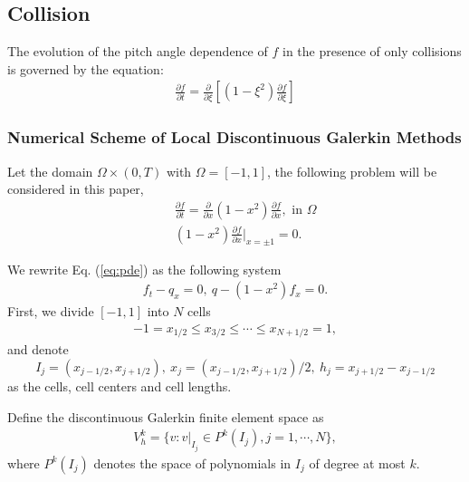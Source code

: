 \documentclass[final,leqno]{siamltex704}
\begin{document}

\subsection{Collision}

The evolution of the pitch angle dependence of $f$ in the presence of only collisions is governed by the equation:
\begin{eqnarray}
\frac{\partial f}{\partial t} = \frac{\partial}{\partial\xi}[(1-\xi^2)\frac{\partial f}{\partial\xi}]
\end{eqnarray}


\subsubsection{Numerical Scheme of Local Discontinuous Galerkin Methods}
Let the domain $\Omega\times(0,T)$ with $\Omega=[-1,1]$, the following problem will be considered in this paper,
\begin{eqnarray}
&&\frac{\partial f}{\partial t} = \frac{\partial}{\partial x}(1-x^2)\frac{\partial f}{\partial x},\mbox{ in }\Omega\label{eq:pde}\\
&&(1-x^2)\frac{\partial f}{\partial x}|_{x=\pm 1} = 0.\label{eq:bc}
\end{eqnarray}


We rewrite Eq. (\ref{eq:pde}) as the following system
\begin{eqnarray}
f_t-q_x=0,\ q-(1-x^2)f_x=0.
\end{eqnarray}
First, we divide $[-1,1]$ into $N$ cells
\begin{eqnarray*}
-1=x_{1/2}\le x_{3/2}\le \cdots\le x_{N+1/2}=1,
\end{eqnarray*}
and denote
$$
I_j=(x_{j-1/2},x_{j+1/2}),\ x_j=(x_{j-1/2},x_{j+1/2})/2,\ h_j=x_{j+1/2}-x_{j-1/2}
$$
as the cells, cell centers and cell lengths.

Define the discontinuous Galerkin finite element space as
\begin{eqnarray}
V_h^k=\{v:v|_{I_j}\in P^k(I_j), j=1,\cdots,N\},
\end{eqnarray}
where $P^k(I_j)$ denotes the space of polynomials in $I_j$ of degree at most $k$.
\end{document}
